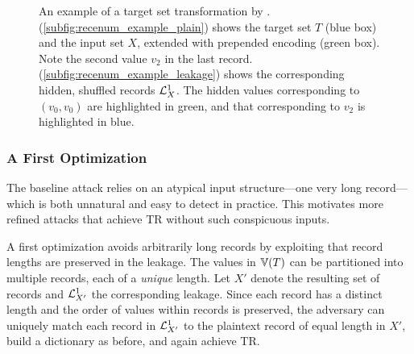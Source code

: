 \begin{figure}[t]
    \centering
    \def\rowspace{-.4pt}
    \def\minwidthemail{2.5cm}
    \def\minwidthphone{2.5cm}
    \def\minwidthid{.6cm}
    \def\linecorr{-.4pt}
    \def\blockminheight{1.5em}
    \quad
    \caption{
    An example of a target set transformation by \recenumattack.
    (\ref{subfig:recenum_example_plain}) shows the target set $T$ (blue box) and the input set $X$, extended with prepended encoding (green box). 
    Note the second value $v_2$ in the last record.
    (\ref{subfig:recenum_example_leakage}) shows the corresponding hidden, shuffled records $\mathcal{L}^{1}_X$.
    The hidden values corresponding to $(v_0,v_0)$ are highlighted in green, and that corresponding to $v_2$ is highlighted in blue.
    }
    \label{fig:recenum_example}
\end{figure}

\subsubsection{A First Optimization}
The baseline attack relies on an atypical input structure---one very long record---which is both unnatural and easy to detect in practice. This motivates more refined attacks that achieve TR without such conspicuous inputs.

A first optimization avoids arbitrarily long records by exploiting that record lengths are preserved in the leakage. The values in $\Ispace[T]$ can be partitioned into multiple records, each of a \emph{unique} length. Let $X'$ denote the resulting set of records and ${\mathcal{L}^{1}_{X'}}$ the corresponding leakage. Since each record has a distinct length and the order of values within records is preserved, the adversary can uniquely match each record in ${\mathcal{L}^{1}_{X'}}$ to the plaintext record of equal length in $X'$, build a dictionary as before, and again achieve TR.

